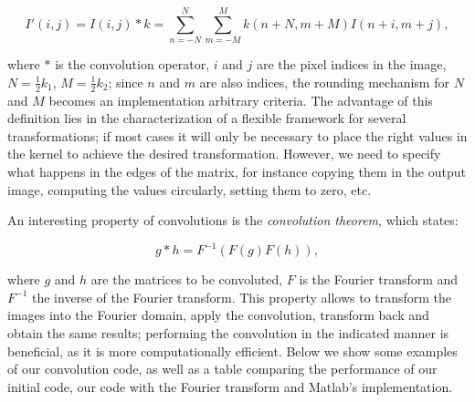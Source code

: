 \documentclass[12pt]{article}
\begin{document}
\begin{equation}
I'(i,j) = I(i,j) * k = \sum_{n = -N}^N \sum_{m = -M}^M k(n + N, m + M) I(n + i,m + j),
\end{equation}

where $*$ is the convolution operator, $i$ and $j$ are the pixel indices in the image, $N = \frac{1}{2}k_1$, $M = \frac{1}{2}k_2$; since $n$ and $m$ are also indices, the rounding mechanism for $N$ and $M$ becomes an implementation arbitrary criteria. 
The advantage of this definition lies in the characterization of a flexible framework for several transformations; if most cases it will only be necessary to place the right values in the kernel to achieve the desired transformation.
However, we need to specify what happens in the edges of the matrix, for instance copying them in the output image, computing the values circularly, setting them to zero, etc.

An interesting property of convolutions is the \emph{convolution theorem}, which states:

\begin{equation}
g * h = F^{-1} ( F(g)  F(h) ),
\end{equation}

where $g$ and $h$ are the matrices to be convoluted, $F$ is the Fourier transform and $F^{-1}$ the inverse of the Fourier transform.
This property allows to transform the images into the Fourier domain, apply the convolution, transform back and obtain the same results; performing the convolution in the indicated manner is beneficial, as it is more computationally efficient.
Below we show some examples of our convolution code, as well as a table comparing the performance of our initial code, our code with the Fourier transform and Matlab's implementation.
\end{document}
